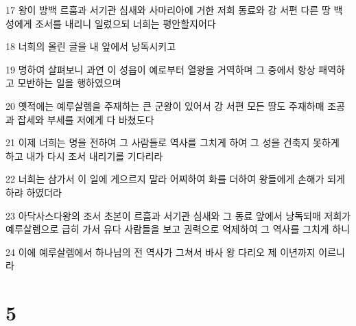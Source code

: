 \par 17 왕이 방백 르훔과 서기관 심새와 사마리아에 거한 저희 동료와 강 서편 다른 땅 백성에게 조서를 내리니 일렀으되 너희는 평안할지어다
\par 18 너희의 올린 글을 내 앞에서 낭독시키고
\par 19 명하여 살펴보니 과연 이 성읍이 예로부터 열왕을 거역하며 그 중에서 항상 패역하고 모반하는 일을 행하였으며
\par 20 옛적에는 예루살렘을 주재하는 큰 군왕이 있어서 강 서편 모든 땅도 주재하매 조공과 잡세와 부세를 저에게 다 바쳤도다
\par 21 이제 너희는 명을 전하여 그 사람들로 역사를 그치게 하여 그 성을 건축지 못하게 하고 내가 다시 조서 내리기를 기다리라
\par 22 너희는 삼가서 이 일에 게으르지 말라 어찌하여 화를 더하여 왕들에게 손해가 되게 하랴 하였더라
\par 23 아닥사스다왕의 조서 초본이 르훔과 서기관 심새와 그 동료 앞에서 낭독되매 저희가 예루살렘으로 급히 가서 유다 사람들을 보고 권력으로 억제하여 그 역사를 그치게 하니
\par 24 이에 예루살렘에서 하나님의 전 역사가 그쳐서 바사 왕 다리오 제 이년까지 이르니라

\chapter{5}


